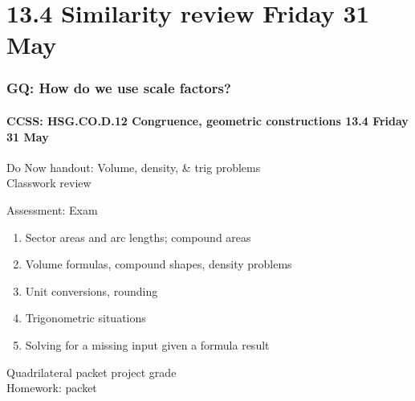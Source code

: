 \documentclass{beamer}
\begin{document}
\section{13.4 Similarity review Friday 31 May}
  \frame
  {
    \frametitle{GQ: How do we use scale factors?}
    \framesubtitle{CCSS: HSG.CO.D.12 Congruence, geometric constructions \hfill \alert{13.4 Friday 31 May}}

    Do Now handout: Volume, density, \& trig problems\\
    Classwork review
    \begin{block}{Assessment: Exam}
      \begin{enumerate}
        \item Sector areas and arc lengths; compound areas
        \item Volume formulas, compound shapes, density problems
        \item Unit conversions, rounding
        \item Trigonometric situations
        \item Solving for a missing input given a formula result
    \end{enumerate}
    \end{block}
    Quadrilateral packet project grade\\[0.5cm]
    Homework: packet
  }
\end{document}
